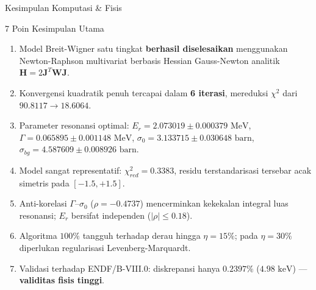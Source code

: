 \documentclass[aspectratio=169, 10pt]{beamer}
\begin{document}
\begin{frame}{Kesimpulan Komputasi \& Fisis}
	\begin{block}{7 Poin Kesimpulan Utama}
		\footnotesize
		\begin{enumerate}
			\item Model Breit-Wigner satu tingkat \textbf{berhasil diselesaikan} menggunakan Newton-Raphson multivariat berbasis Hessian Gauss-Newton analitik $\mathbf{H} = 2\mathbf{J}^T\mathbf{W}\mathbf{J}$.
			\item Konvergensi kuadratik penuh tercapai dalam \textbf{6 iterasi}, mereduksi $\chi^2$ dari $90.8117 \to 18.6064$.
			\item Parameter resonansi optimal: $E_r = 2.073019 \pm 0.000379\text{ MeV}$, $\Gamma = 0.065895 \pm 0.001148\text{ MeV}$, $\sigma_0 = 3.133715 \pm 0.030648\text{ barn}$, $\sigma_{bg} = 4.587609 \pm 0.008926\text{ barn}$.
			\item Model sangat representatif: $\chi^2_{red} = 0.3383$, residu terstandarisasi tersebar acak simetris pada $[-1.5, +1.5]$.
			\item Anti-korelasi $\Gamma$--$\sigma_0$ ($\rho = -0.4737$) mencerminkan kekekalan integral luas resonansi; $E_r$ bersifat independen ($|\rho| \le 0.18$).
			\item Algoritma $100\%$ tangguh terhadap derau hingga $\eta = 15\%$; pada $\eta = 30\%$ diperlukan regularisasi Levenberg-Marquardt.
			\item Validasi terhadap ENDF/B-VIII.0: diskrepansi hanya $0.2397\%$ ($4.98\text{ keV}$) --- \textbf{validitas fisis tinggi}.
		\end{enumerate}
	\end{block}
\end{frame}
\end{document}
